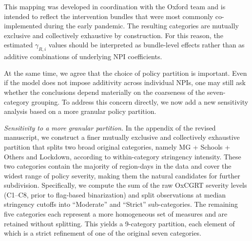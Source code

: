\documentclass[letterpaper,twoside,11pt]{reviewresponse}
\begin{document}
\begin{enumerate}
This mapping was developed in coordination with the Oxford team and is intended to reflect the intervention bundles that were most commonly co-implemented during the early pandemic. The resulting categories are mutually exclusive and collectively exhaustive by construction. For this reason, the estimated $\gamma_{R,i}$ values should be interpreted as bundle-level effects rather than as additive combinations of underlying NPI coefficients.

At the same time, we agree that the choice of policy partition is important. Even if the model does not impose additivity across individual NPIs, one may still ask whether the conclusions depend materially on the coarseness of the seven-category grouping. To address this concern directly, we now add a new sensitivity analysis based on a more granular policy partition.

\textit{Sensitivity to a more granular partition.}  
In the appendix of the revised manuscript, we construct a finer mutually exclusive and collectively exhaustive partition that splits two broad original categories, namely MG + Schools + Others and Lockdown, according to within-category stringency intensity. These two categories contain the majority of region-days in the data and cover the widest range of policy severity, making them the natural candidates for further subdivision. Specifically, we compute the sum of the raw OxCGRT severity levels (C1--C8, prior to flag-based binarization) and split observations at median stringency cutoffs into ``Moderate'' and ``Strict'' sub-categories. The remaining five categories each represent a more homogeneous set of measures and are retained without splitting. This yields a 9-category partition, each element of which is a strict refinement of one of the original seven categories.


\end{enumerate}
\end{document}
